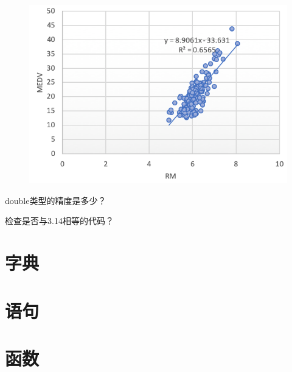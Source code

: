 \begin{example}
	\begin{figure}[!htb]
		\centerline{\includegraphics{part1/boston-rm.png}}
	\end{figure}
\end{example}


\begin{exercise}
	double类型的精度是多少？
\end{exercise}

\begin{exercise}
	检查是否与3.14相等的代码？
\end{exercise}

\section{字典}


\section{语句}

\section{函数}